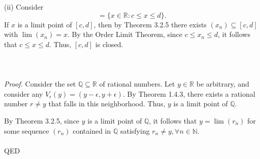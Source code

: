 \documentclass{article}
\begin{document}
            (ii) Consider 
            \begin{equation*}
                [c,d] = \{x \in \mathbb{R}: c \leq x \leq d\}.
            \end{equation*}
            If $x$ is a limit point of $[c,d]$, then by Theorem 3.2.5 there exists $(x_n) \subseteq [c,d]$ with $\lim (x_n) = x$. By the Order Limit Theorem, since $c \leq x_n \leq d$, it follows that $c \leq x \leq d$. Thus, $[c,d]$ is closed.
            \\ \\
            \\ \\
            \textit{Proof.} Consider the set $\mathbb{Q} \subseteq \mathbb{R}$ of rational numbers. Let $y \in \mathbb{R}$ be arbitrary, and consider any $V_\epsilon(y) = (y-\epsilon,y+\epsilon)$. By Theorem 1.4.3, there exists a rational number $r \neq y$ that falls in this neighborhood. Thus, $y$ is a limit point of $\mathbb{Q}$.
            
            By Theorem 3.2.5, since $y$ is a limit point of $\mathbb{Q}$, it follows that $y = \lim(r_n)$ for some sequence $(r_n)$ contained in $\mathbb{Q}$ satisfying $r_n \neq y, \forall n \in \mathbb{N}$.\\ \\
            QED
\end{document}
